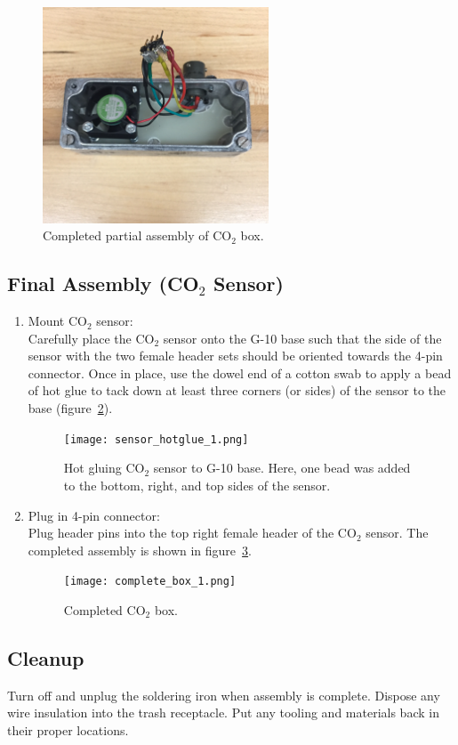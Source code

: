 \documentclass[letterpaper,12pt]{article}
\begin{document}
\begin{enumerate}
		\begin{figure} [h]
			\centering
			\includegraphics[width=0.6\textwidth]{partial_assembly_1.png}
			\caption{Completed partial assembly of  CO$_2$ box.}
			\label{fig:partial_assembly}
		\end{figure}
	\end{enumerate}
	
\subsection{Final Assembly (CO$_2$ Sensor)}
	\begin{enumerate}
		\item Mount CO$_2$ sensor: \\
		\textnormal{Carefully place the CO$_2$ sensor onto the G-10 base such that the side of the sensor with the two female header sets should be oriented towards the 4-pin connector. Once in place, use the dowel end of a cotton swab to apply a bead of hot glue to tack down at least three corners (or sides) of the sensor to the base (figure~\ref{fig:hotglue}).}
		\begin{figure} [h]
			\centering
			\texttt{[image: sensor\_hotglue\_1.png]}
			\caption{Hot gluing CO$_2$ sensor to G-10 base. Here, one bead was added to the bottom, right, and top sides of the sensor.}
			\label{fig:hotglue}
		\end{figure}
		\item Plug in 4-pin connector: \\
		\textnormal{Plug header pins into the top right female header of the CO$_2$ sensor. The completed assembly is shown in figure~\ref{fig:complete}.}
		\begin{figure} [h]
			\centering
			\texttt{[image: complete\_box\_1.png]}
			\caption{Completed CO$_2$ box.}
			\label{fig:complete}
		\end{figure}
	\end{enumerate}
	
\subsection{Cleanup}
	\textnormal{Turn off and unplug the soldering iron when assembly is complete. Dispose any wire insulation into the trash receptacle. Put any tooling and materials back in their proper locations.}
\end{document}
